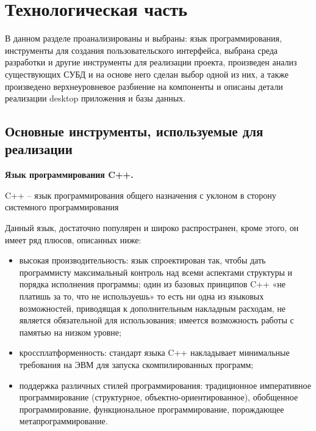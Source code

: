 \chapter{Технологическая часть}
\label{cha:impl}

В данном разделе проанализированы и выбраны: язык программирования, инструменты для создания пользовательского интерфейса, выбрана среда разработки и другие инструменты для реализации проекта, произведен анализ существующих СУБД и на основе него сделан выбор одной из них, а также произведено верхнеуровневое разбиение на компоненты и описаны детали реализации desktop приложения и базы данных.

\section{Основные инструменты, используемые для реализации}

\noindent\textbf{Язык программирования C++.}

C++ -- язык программирования общего назначения с уклоном в сторону системного программирования \cite{Cpp}

Данный язык, достаточно популярен и широко распространен, кроме этого, он имеет ряд плюсов, описанных ниже:

\begin{itemize}
	\item высокая производительность: язык спроектирован так, чтобы дать программисту максимальный контроль над всеми аспектами структуры и порядка исполнения программы; один из базовых принципов C++ «не платишь за то, что не используешь» то есть ни одна из языковых возможностей, приводящая к дополнительным накладным расходам, не является обязательной для использования; имеется возможность работы с памятью на низком уровне;
	\item кроссплатформенность: стандарт языка C++ накладывает минимальные требования на ЭВМ для запуска скомпилированных программ;
	\item поддержка различных стилей программирования: традиционное императивное программирование (структурное, объектно-ориентированное), обобщенное программирование, функциональное программирование, порождающее метапрограммирование.
\end{itemize}

